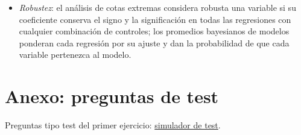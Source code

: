 \documentclass[11pt]{article}
\begin{document}
\begin{itemize}
\item \emph{Robustez}: el análisis de cotas extremas\nocite{Leamer1983,LevineRenelt1992} considera robusta una variable si su coeficiente conserva el signo y la significación en todas las regresiones con cualquier combinación de controles; los promedios bayesianos de modelos\nocite{SalaiMartinDoppelhoferMiller2004} ponderan cada regresión por su ajuste y dan la probabilidad de que cada variable pertenezca al modelo.
\end{itemize}

\section{Anexo: preguntas de test}\label{anexo:test}

\begin{anotaciones}
Preguntas tipo test del primer ejercicio: \href{https://www.victorgutierrezmarcos.es/oposicion/temario/primer-ejercicio/test/simulador.html?tema=3.A.45}{simulador de test}.
\end{anotaciones}

\bibliografia
\end{document}
